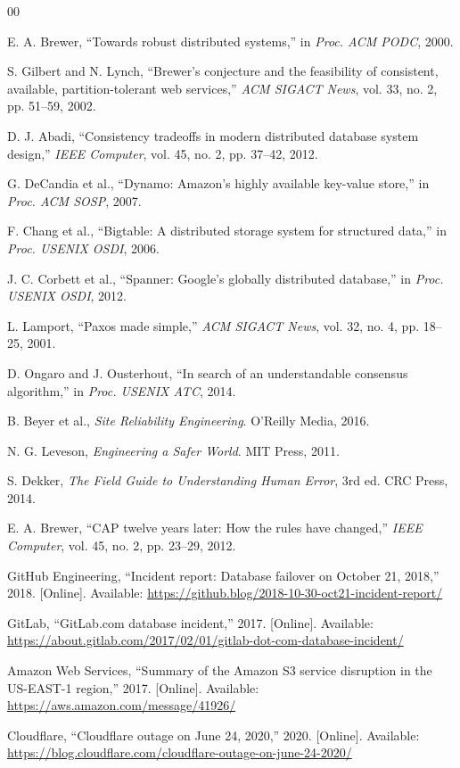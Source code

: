 \documentclass[conference]{IEEEtran}
\begin{document}
\begin{thebibliography}{00}

E. A. Brewer, ``Towards robust distributed systems,'' in \textit{Proc. ACM PODC}, 2000.

S. Gilbert and N. Lynch, ``Brewer's conjecture and the feasibility of consistent, available, partition-tolerant web services,'' \textit{ACM SIGACT News}, vol. 33, no. 2, pp. 51--59, 2002.

D. J. Abadi, ``Consistency tradeoffs in modern distributed database system design,'' \textit{IEEE Computer}, vol. 45, no. 2, pp. 37--42, 2012.

G. DeCandia et al., ``Dynamo: Amazon's highly available key-value store,'' in \textit{Proc. ACM SOSP}, 2007.

F. Chang et al., ``Bigtable: A distributed storage system for structured data,'' in \textit{Proc. USENIX OSDI}, 2006.

J. C. Corbett et al., ``Spanner: Google's globally distributed database,'' in \textit{Proc. USENIX OSDI}, 2012.

L. Lamport, ``Paxos made simple,'' \textit{ACM SIGACT News}, vol. 32, no. 4, pp. 18--25, 2001.

D. Ongaro and J. Ousterhout, ``In search of an understandable consensus algorithm,'' in \textit{Proc. USENIX ATC}, 2014.

B. Beyer et al., \textit{Site Reliability Engineering}. O'Reilly Media, 2016.

N. G. Leveson, \textit{Engineering a Safer World}. MIT Press, 2011.

S. Dekker, \textit{The Field Guide to Understanding Human Error}, 3rd ed. CRC Press, 2014.

E. A. Brewer, ``CAP twelve years later: How the rules have changed,'' \textit{IEEE Computer}, vol. 45, no. 2, pp. 23--29, 2012.

GitHub Engineering, ``Incident report: Database failover on October 21, 2018,'' 2018. [Online]. Available: \url{https://github.blog/2018-10-30-oct21-incident-report/}

GitLab, ``GitLab.com database incident,'' 2017. [Online]. Available: \url{https://about.gitlab.com/2017/02/01/gitlab-dot-com-database-incident/}

Amazon Web Services, ``Summary of the Amazon S3 service disruption in the US-EAST-1 region,'' 2017. [Online]. Available: \url{https://aws.amazon.com/message/41926/}

Cloudflare, ``Cloudflare outage on June 24, 2020,'' 2020. [Online]. Available: \url{https://blog.cloudflare.com/cloudflare-outage-on-june-24-2020/}

\end{thebibliography}
\end{document}
